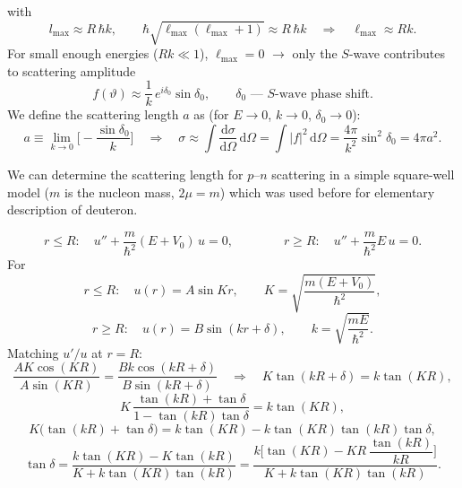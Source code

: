 \documentclass[11pt,a4paper]{article}
\newcommand{\ud}{\mathrm{d}}
\begin{document}
\begin{center}
\end{center}
with 
\[
l_{\max}\approx R\,\hbar k,\qquad
\hbar\sqrt{\ell_{\max}(\ell_{\max}+1)}\approx R\,\hbar k
\quad\Rightarrow\quad \ell_{\max}\approx Rk .
\]
For small enough energies ($Rk\ll1$), $\ell_{\max}=0$ $\to$ only the $S$-wave
contributes to scattering amplitude
\[
f(\vartheta)\approx\frac1k\,e^{i\delta_0}\sin\delta_0,
\qquad \delta_0 \text{ --- $S$-wave phase shift.}
\]
We define the scattering length $a$ as (for $E\to0$, $k\to0$, $\delta_0\to0$):
\[
a\equiv\lim_{k\to0}\Big[-\frac{\sin\delta_0}{k}\Big]
\quad\Rightarrow\quad
\sigma\approx\int\frac{\ud\sigma}{\ud\Omega}\,\ud\Omega=\int|f|^2\,\ud\Omega
=\frac{4\pi}{k^2}\sin^2\delta_0=4\pi a^2 .
\]

We can determine the scattering length for $p$--$n$ scattering in a simple
square-well model ($m$ is the nucleon mass, $2\mu=m$) which was used before for elementary description of deuteron. 

\begin{center}
\end{center}
\[
r\le R:\quad u''+\frac{m}{\hbar^2}(E+V_0)\,u=0,
\qquad\qquad
r\ge R:\quad u''+\frac{m}{\hbar^2}E\,u=0 .
\]
For
\[
r\le R:\quad u(r)=A\sin Kr,\qquad K=\sqrt{\frac{m(E+V_0)}{\hbar^2}},
\]
\[
r\ge R:\quad u(r)=B\sin(kr+\delta),\qquad k=\sqrt{\frac{mE}{\hbar^2}} .
\]
Matching $u'/u$ at $r=R$:
\[
\frac{AK\cos(KR)}{A\sin(KR)}=\frac{Bk\cos(kR+\delta)}{B\sin(kR+\delta)}
\quad\Rightarrow\quad
K\tan(kR+\delta)=k\tan(KR),
\]
\[
K\,\frac{\tan(kR)+\tan\delta}{1-\tan(kR)\tan\delta}=k\tan(KR),
\]
\[
K\big(\tan(kR)+\tan\delta\big)=k\tan(KR)-k\tan(KR)\tan(kR)\tan\delta,
\]
\[
\tan\delta=\frac{k\tan(KR)-K\tan(kR)}{K+k\tan(KR)\tan(kR)}
=\frac{k\Big[\tan(KR)-KR\,\dfrac{\tan(kR)}{kR}\Big]}{K+k\tan(KR)\tan(kR)} .
\]
\end{document}
